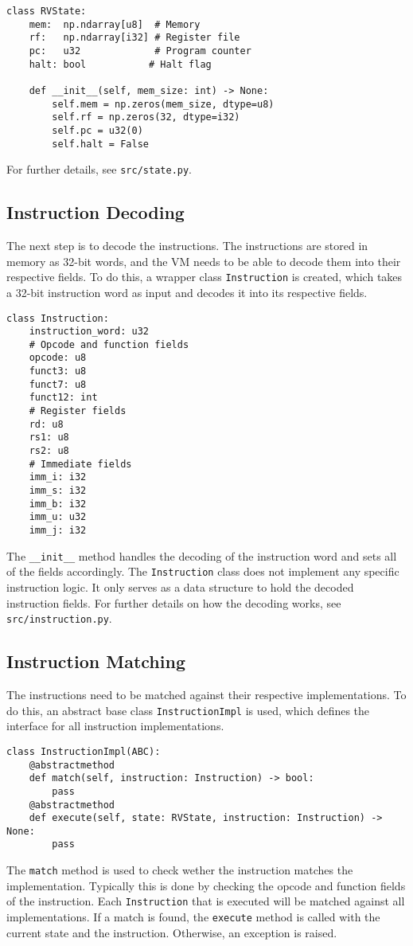 \documentclass[sigconf]{acmart}
\begin{document}
\begin{verbatim}
class RVState:
    mem:  np.ndarray[u8]  # Memory
    rf:   np.ndarray[i32] # Register file
    pc:   u32             # Program counter
    halt: bool           # Halt flag

    def __init__(self, mem_size: int) -> None:
        self.mem = np.zeros(mem_size, dtype=u8)
        self.rf = np.zeros(32, dtype=i32)
        self.pc = u32(0)
        self.halt = False
\end{verbatim}
For further details, see \texttt{src/state.py}.

\subsection{Instruction Decoding}
The next step is to decode the instructions. The instructions are stored in memory as 32-bit words, and the VM needs to be able to decode them into their respective fields.
To do this, a wrapper class \texttt{Instruction} is created, which takes a 32-bit instruction word as input and decodes it into its respective fields.
\begin{verbatim}
class Instruction:
    instruction_word: u32
    # Opcode and function fields
    opcode: u8
    funct3: u8
    funct7: u8
    funct12: int
    # Register fields
    rd: u8
    rs1: u8
    rs2: u8
    # Immediate fields
    imm_i: i32
    imm_s: i32
    imm_b: i32
    imm_u: u32
    imm_j: i32
\end{verbatim}
The \texttt{\_\_init\_\_} method handles the decoding of the instruction word and sets all of the fields accordingly.
The \texttt{Instruction} class does not implement any specific instruction logic. It only serves as a data structure to hold the decoded instruction fields.
For further details on how the decoding works, see \texttt{src/instruction.py}.

\subsection{Instruction Matching}
The instructions need to be matched against their respective implementations. To do this, an abstract base class \texttt{InstructionImpl} is used, which defines the interface for all instruction implementations.
\begin{verbatim}
class InstructionImpl(ABC):
    @abstractmethod
    def match(self, instruction: Instruction) -> bool:
        pass
    @abstractmethod
    def execute(self, state: RVState, instruction: Instruction) -> None:
        pass
\end{verbatim}
The \texttt{match} method is used to check wether the instruction matches the implementation. Typically this is done by checking the opcode and function fields of the instruction.
Each \texttt{Instruction} that is executed will be matched against all implementations. 
If a match is found, the \texttt{execute} method is called with the current state and the instruction. Otherwise, an exception is raised.
\end{document}

